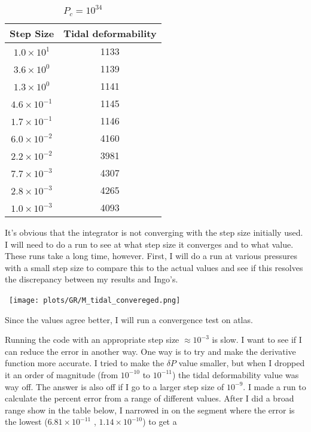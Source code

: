\documentclass[11pt]{article}
\numberwithin{equation}{section}
\begin{document}
\begin{table}[h]
\centering
\caption{$P_{c} = 10^{34}$}
\begin{tabular}{|c | c|} \hline
Step Size & Tidal deformability \\ \hline
$1.0 \times 10^1$ & 1133 \\ 
$3.6 \times 10^0$ & 1139 \\
$1.3 \times 10^0$ & 1141 \\
$4.6 \times 10^{-1}$ &  1145 \\
$1.7 \times 10^{-1}$ & 1146 \\
$6.0 \times 10^{-2}$ & 4160 \\ 
$2.2 \times 10^{-2}$ & 3981 \\
$7.7 \times 10^{-3}$ & 4307 \\ 
$2.8 \times 10^{-3}$ & 4265 \\
$1.0 \times 10^{-3}$ & 4093  \\
\hline
\end{tabular}
\end{table}

It's obvious that the integrator is not converging with the step size initially used.  I will need to do a run to see at what step size it converges and to what value.  These runs take a long time, however. First, I will do a run at various pressures with a small step size to compare this to the actual values and see if this resolves the discrepancy between my results and Ingo's. 


\begin{center}
\hbox{
\texttt{[image: plots/GR/M\_tidal\_convereged.png]}}
\end{center}

Since the values agree better, I will run a convergence test on atlas.  

Running the code with an appropriate step size $\approx 10^{-3}$ is slow.  I want to see if I can reduce the error in another way.  One way is to try and make the derivative function more accurate.  I tried to make the $\delta P$ value smaller, but when I dropped it an order of magnitude (from $10^{-10}$ to $10^{-11}$) the tidal deformability value was way off.  The answer is also off if I go to a larger step size of $10^{-9}$.  I made a run to calculate the percent error from a range of different values.  After I did a broad range show in the table below, I narrowed in on the segment where the error is the lowest ($6.81 \times 10^{-11}$ , $1.14 \times 10^{-10}$) to get a 
\end{document}
